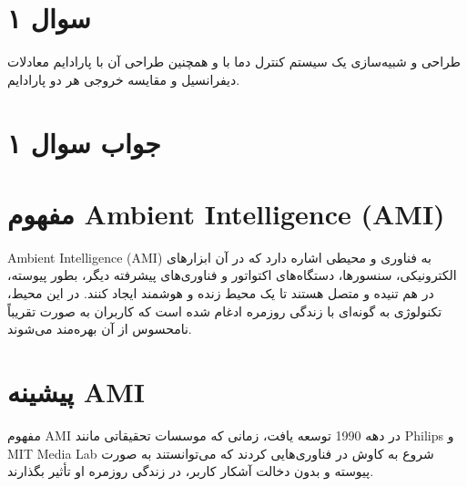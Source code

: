 \section*{سوال ۱}

طراحی و شبیه‌سازی یک سیستم کنترل دما
با
و همچنین طراحی آن با پارادایم معادلات دیفرانسیل و مقایسه خروجی هر دو پارادایم.


\section*{جواب سوال ۱}

\section*{مفهوم Ambient Intelligence (AMI)}
Ambient Intelligence (AMI) به فناوری و محیطی اشاره دارد که در آن ابزارهای الکترونیکی، سنسورها، دستگاه‌های اکتواتور و فناوری‌های پیشرفته دیگر، بطور پیوسته، در هم تنیده و متصل هستند تا یک محیط زنده و هوشمند ایجاد کنند. در این محیط، تکنولوژی به گونه‌ای با زندگی روزمره ادغام شده است که کاربران به صورت تقریباً نامحسوس از آن بهره‌مند می‌شوند.

\section*{پیشینه AMI}
مفهوم AMI در دهه 1990 توسعه یافت، زمانی که موسسات تحقیقاتی مانند Philips و MIT Media Lab شروع به کاوش در فناوری‌هایی کردند که می‌توانستند به صورت پیوسته و بدون دخالت آشکار کاربر، در زندگی روزمره او تأثیر بگذارند.
